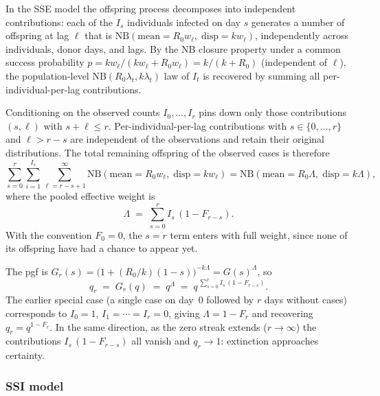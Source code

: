 \documentclass{article}
\theoremstyle{definition}
\begin{document}
In the SSE model the offspring process decomposes into independent
contributions: each of the $I_s$ individuals infected on day $s$ generates
a number of offspring at lag $\ell$ that is
$\mathrm{NB}(\text{mean} = R_0 w_\ell,\;\text{disp} = k w_\ell)$,
independently across individuals, donor days, and lags.  By the NB closure
property under a common success probability
$p = k w_\ell / (k w_\ell + R_0 w_\ell) = k / (k + R_0)$ (independent of
$\ell$), the population-level $\mathrm{NB}(R_0 \lambda_t, k \lambda_t)$ law
of $I_t$ is recovered by summing all per-individual-per-lag contributions.

Conditioning on the observed counts $I_0, \ldots, I_r$ pins down only those
contributions $(s, \ell)$ with $s + \ell \leq r$.  Per-individual-per-lag
contributions with $s \in \{0, \ldots, r\}$ and $\ell > r - s$ are
independent of the observations and retain their original distributions.
The total remaining offspring of the observed cases is therefore
\begin{equation}
  \sum_{s=0}^{r} \sum_{i=1}^{I_s} \sum_{\ell = r-s+1}^{\infty}
  \mathrm{NB}(\text{mean} = R_0 w_\ell,\;\text{disp} = k w_\ell)
  = \mathrm{NB}(\text{mean} = R_0 \Lambda,\;\text{disp} = k \Lambda),
\end{equation}
where the pooled effective weight is
\begin{equation}
  \Lambda \;=\; \sum_{s=0}^{r} I_s\,(1 - F_{r-s}).
\end{equation}
With the convention $F_0 = 0$, the $s = r$ term enters with full weight,
since none of its offspring have had a chance to appear yet.

The pgf is
$G_r(s) = \bigl(1 + (R_0/k)(1-s)\bigr)^{-k\Lambda} = G(s)^{\Lambda}$, so
\begin{equation}\label{eq:qr_sse}
  q_r \;=\; G_r(q) \;=\; q^{\Lambda}
  \;=\; q^{\,\sum_{s=0}^{r} I_s\,(1 - F_{r-s})}.
\end{equation}
The earlier special case (a single case on day~0 followed by $r$ days
without cases) corresponds to $I_0 = 1$, $I_1 = \cdots = I_r = 0$, giving
$\Lambda = 1 - F_r$ and recovering $q_r = q^{1 - F_r}$.  In the same
direction, as the zero streak extends ($r \to \infty$) the contributions
$I_s\,(1-F_{r-s})$ all vanish and $q_r \to 1$: extinction approaches
certainty.

\subsubsection{SSI model}
\label{sec:qr_ssi}
\end{document}
